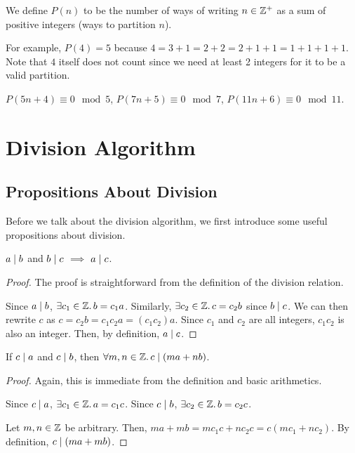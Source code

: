 We define $P(n)$ to be the number of ways of writing $n \in \mathbb{Z}^+$ as a sum of positive integers (ways to partition $n$).

For example, $P(4) = 5$ because $4 = 3+1 = 2+2 = 2+1+1 = 1+1+1+1$. Note that $4$ itself does not count since we need at least 2 integers for it to be a valid partition.

\begin{conjecture}
    $P(5n + 4) \equiv 0 \mod 5$, $P(7n + 5) \equiv 0 \mod 7$, $P(11n + 6) \equiv 0 \mod 11$.
\end{conjecture}

\section{Division Algorithm}

\subsection{Propositions About Division}

Before we talk about the division algorithm, we first introduce some useful propositions about division.

\begin{proposition}
    $a \mathrel{\mid} b$ and $b \mathrel{\mid} c$ $\implies$ $a \mathrel{\mid} c$. 
\end{proposition}

\begin{proof}
    The proof is straightforward from the definition of the division relation.

    Since $a \mathrel{\mid} b$, $\exists c_1 \in \mathbb{Z}.\, b = c_1a$. Similarly, $\exists c_2 \in \mathbb{Z}.\, c = c_2 b$ since $b \mathrel{\mid} c$. We can then rewrite $c$ as $c = c_2 b = c_1c_2a = (c_1c_2)a$. Since $c_1$ and $c_2$ are all integers, $c_1c_2$ is also an integer. Then, by definition, $a \mathrel{\mid} c$.
\end{proof}

\begin{proposition}
    If $c \mathrel{\mid} a$ and $c \mathrel{\mid} b$, then $\forall m,n \in \mathbb{Z}.\, c \mathrel{\mid} (ma+nb)$.
\end{proposition}

\begin{proof}
    Again, this is immediate from the definition and basic arithmetics.

    Since $c \mathrel{\mid} a$, $\exists c_1 \in \mathbb{Z}.\, a = c_1c$. Since $c \mathrel{\mid} b$, $\exists c_2 \in \mathbb{Z}.\, b = c_2 c$.

    Let $m,n \in \mathbb{Z}$ be arbitrary. Then, $ma + mb = mc_1c+nc_2c = c(mc_1 + nc_2)$. By definition, $c \mathrel{\mid} (ma + mb)$.
\end{proof}

